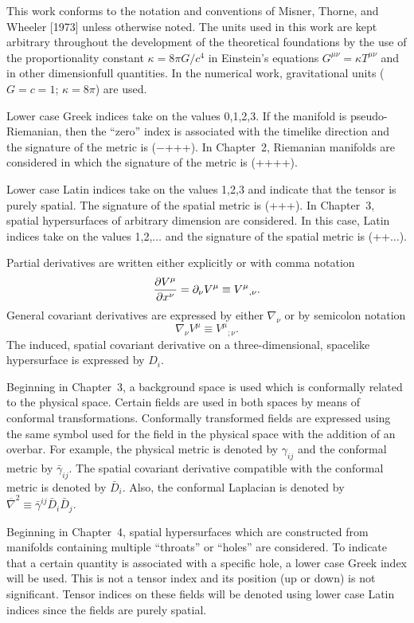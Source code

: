 This work conforms to the notation and conventions of Misner, Thorne, and
Wheeler [1973] unless otherwise noted.  The units used in this work are kept
arbitrary throughout the development of the theoretical foundations by the use
of the proportionality constant $\kappa = 8\pi{G}/c^4$ in Einstein's equations
$G^{\mu\nu}=\kappa{T^{\mu\nu}}$ and in other dimensionfull quantities.  In the
numerical work, gravitational units ($G=c=1$; $\kappa=8\pi$) are used.

Lower case Greek indices take on the values 0,1,2,3.  If the manifold is
pseudo-Riemanian, then the ``zero'' index is associated with the timelike
direction and the signature of the metric is ($-$+++).  In Chapter~2, Riemanian
manifolds are considered in which the signature of the metric is (++++).

Lower case Latin indices take on the values 1,2,3 and indicate that the tensor
is purely spatial.  The signature of the spatial metric is (+++).  In Chapter~3,
spatial hypersurfaces of arbitrary dimension are considered.  In this case,
Latin indices take on the values 1,2,$\ldots$ and the signature of the spatial
metric is (++$\ldots$).

Partial derivatives are written either explicitly or with comma notation
$$
{\partial V^\mu \over \partial x^\nu} = \partial_\nu V^\mu \equiv
{V^\mu}_{,\nu}. $$
General covariant derivatives are expressed by either $\nabla_\nu$ or by
semicolon notation
$$
{\nabla_\nu V^\mu} \equiv {V^\mu}_{;\nu}.
$$
The induced, spatial covariant derivative on a three-dimensional, spacelike
hypersurface is expressed by $D_i$.

Beginning in Chapter~3, a background space is used which is conformally related
to the physical space.  Certain fields are used in both spaces by means of
conformal transformations.  Conformally transformed fields are expressed using
the same symbol used for the field in the physical space with the addition of an
overbar.  For example, the physical metric is denoted by $\gamma_{ij}$ and the
conformal metric by $\bar\gamma_{ij}$.  The spatial covariant derivative
compatible with the conformal metric is denoted by $\bar{D}_i$.  Also, the
conformal Laplacian is denoted by $\overline{\nabla}^2 \equiv
\bar\gamma^{ij}\bar{D}_i\bar{D}_j$.

Beginning in Chapter~4, spatial hypersurfaces which are constructed from
manifolds containing multiple ``throats'' or ``holes'' are considered.  To
indicate that a certain quantity is associated with a specific hole, a lower
case Greek index will be used.  This is not a tensor index and its position (up
or down) is not significant.  Tensor indices on these fields will be denoted
using lower case Latin indices since the fields are purely spatial.

\vfill
\eject